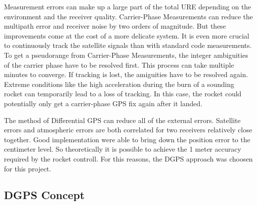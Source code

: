 Measurement errors can make up a large part of the total URE depending on the environment and the receiver quality.
Carrier-Phase Measurements can reduce the multipath error and receiver noise by two orders of magnitude.
But these improvements come at the cost of a more delicate system.
It is even more crucial to continuously track the satellite signals than with standard code measurements.
To get a pseudorange from Carrier-Phase Measurements, the integer ambiguities of the carrier phase have to be resolved first.
This process can take multiple minutes to converge.
If tracking is lost, the amiguities have to be resolved again.
Extreme conditions like the high acceleration during the burn of a sounding rocket can temporarily lead to a loss of tracking.
In this case, the rocket could potentially only get a carrier-phase GPS fix again after it landed.

The method of Differential GPS can reduce all of the external errors.
Satellite errors and atmospheric errors are both correlated for two receivers relatively close together.
Good implementation were able to bring down the position error to the centimeter level.
So theoretically it is possible to achieve the 1 meter accuracy required by the rocket controll.
For this reasons, the DGPS approach was choosen for this project.

\subsection{DGPS Concept}

